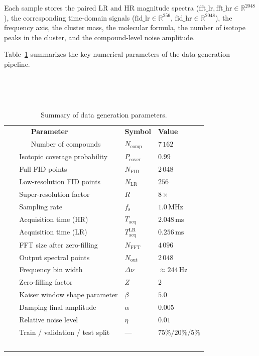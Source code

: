 \documentclass[12pt,a4paper]{report}
\begin{document}
Each sample stores the paired LR and HR magnitude spectra
($\text{fft\_lr}, \text{fft\_hr} \in \mathbb{R}^{2048}$), the corresponding
time-domain signals ($\text{fid\_lr} \in \mathbb{R}^{256}$,
$\text{fid\_hr} \in \mathbb{R}^{2048}$), the frequency axis, the cluster mass,
the molecular formula, the number of isotope peaks in the cluster, and the
compound-level noise amplitude.

\bigskip
Table~\ref{tab:data-summary} summarizes the key numerical parameters of the
data generation pipeline.


\begin{table}[H]
  \centering
  \caption{Summary of data generation parameters.}
  \label{tab:data-summary}
  \renewcommand{\arraystretch}{1.08}
  \begin{tabular}{@{}p{}>{\centering\arraybackslash}p{}>{\centering\arraybackslash}p{}@{}}
    \toprule
    \textbf{Parameter} & \textbf{Symbol} & \textbf{Value} \\
    \midrule
    Number of compounds & $N_{\mathrm{comp}}$ & $7\,162$ \\
    Isotopic coverage probability & $P_{\mathrm{cover}}$ & $0.99$ \\
    Full FID points & $N_{\mathrm{FID}}$ & $2\,048$ \\
    Low-resolution FID points & $N_{\mathrm{LR}}$ & $256$ \\
    Super-resolution factor & $R$ & $8\times$ \\
    Sampling rate & $f_{\mathrm{s}}$ & $1.0\,\mathrm{MHz}$ \\
    Acquisition time (HR) & $T_{\mathrm{acq}}$ & $2.048\,\mathrm{ms}$ \\
    Acquisition time (LR) & $T_{\mathrm{acq}}^{\mathrm{LR}}$ & $0.256\,\mathrm{ms}$ \\
    FFT size after zero-filling & $N_{\mathrm{FFT}}$ & $4\,096$ \\
    Output spectral points & $N_{\mathrm{out}}$ & $2\,048$ \\
    Frequency bin width & $\Delta\nu$ & $\approx 244\,\mathrm{Hz}$ \\
    Zero-filling factor & $Z$ & $2$ \\
    Kaiser window shape parameter & $\beta$ & $5.0$ \\
    Damping final amplitude & $\alpha$ & $0.005$ \\
    Relative noise level & $\eta$ & $0.01$ \\
    Train / validation / test split & --- & $75\% / 20\% / 5\%$ \\
    \bottomrule
  \end{tabular}
\end{table}
\end{document}
